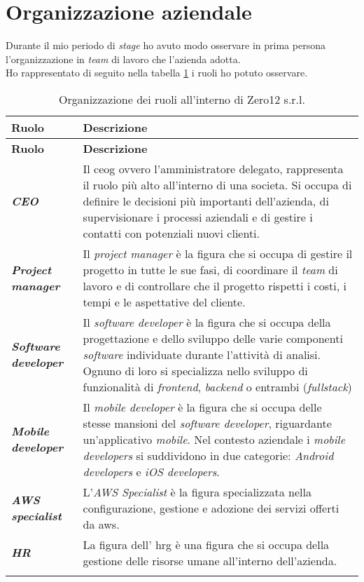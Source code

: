 \section{Organizzazione aziendale}
Durante il mio periodo di \textit{stage} ho avuto modo osservare in prima persona l'organizzazione in \textit{team} di lavoro che l'azienda adotta.\\
Ho rappresentato di seguito nella tabella \ref{tab:ruoli} i ruoli ho potuto osservare.
\begin{longtable}{|p{3.5cm}|p{8cm}|}
    \hline
    \rowcolor{tableheader}\textbf{Ruolo} & \textbf{Descrizione} \\
    \hline
    \endfirsthead

    \rowcolor{tableheader}\textbf{Ruolo} & \textbf{Descrizione} \\
    \hline
    \endhead

    \hline
    \endfoot

    \hline
    \endlastfoot
    \hline
    \rowcolor{tableoddrow}\textbf{\textit{CEO}} & Il \gls{ceog} ovvero l'amministratore delegato, rappresenta il ruolo più alto all'interno di una societa. Si occupa di definire le decisioni più importanti dell'azienda, di supervisionare i processi aziendali e di gestire i contatti con potenziali nuovi clienti. \\
    \hline
    \rowcolor{tableevenrow}\textbf{\textit{Project manager}} & Il \textit{project manager} è la figura che si occupa di gestire il progetto in tutte le sue fasi, di coordinare il \textit{team} di lavoro e di controllare che il progetto rispetti i costi, i tempi e le aspettative del cliente.\\
    \hline
    \rowcolor{tableoddrow}\textbf{\textit{Software developer}} & Il \textit{software developer} è la figura che si occupa della progettazione e dello sviluppo delle varie componenti \textit{software} individuate durante l'attività di analisi. Ognuno di loro si specializza nello sviluppo di funzionalità di \textit{frontend}, \textit{backend} o entrambi (\textit{fullstack})\\
    \hline
    \rowcolor{tableevenrow}\textbf{\textit{Mobile developer}} & Il \textit{mobile developer} è la figura che si occupa delle stesse mansioni del \textit{software developer}, riguardante un'applicativo \textit{mobile}. Nel contesto aziendale i \textit{mobile developers} si suddividono in due categorie: \textit{Android developers} e \textit{iOS developers}.\\
    \hline
    \rowcolor{tableoddrow}\textbf{\textit{AWS specialist}} & L'\textit{AWS Specialist} è la figura specializzata nella configurazione, gestione e adozione dei servizi offerti da \gls{aws}.\\
    \hline
    \rowcolor{tableevenrow}\textbf{\textit{HR}} & La figura dell' \gls{hrg} è una figura che si occupa della gestione delle risorse umane all'interno dell'azienda.\\
    \hline
    \caption{Organizzazione dei ruoli all'interno di Zero12 s.r.l.}
    \label{tab:ruoli}
\end{longtable}

